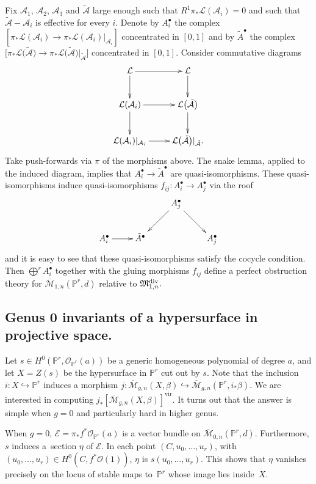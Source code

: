 \documentclass[pdftex]{sigma}
\numberwithin{equation}{section}
\newcommand{\PP}{\mathbb P}
\newcommand{\MM}[4]{\overline{\mathcal M}_{#1,#2}(#3,#4)}
\theoremstyle{plain}
\theoremstyle{definition}
\theoremstyle{remark}
\begin{document}
Fix $\mathcal{A}_1$, $\mathcal{A}_2$, $\mathcal{A}_3$ and $\tilde{\mathcal{A}}$ large enough such that $R^1\pi_*\mathcal{L}(\mathcal{A}_i)=0$ and such that $\tilde{\mathcal{A}}-\mathcal{A}_i$ is effective for every $i$. Denote by $A_i^{\bullet}$ the complex $[\pi_*\mathcal{L}(\mathcal{A}_i)\to \pi_*\mathcal{L}(\mathcal{A}_i)|_{\mathcal{A}_i}]$ concentrated in $[0,1]$ and by $\tilde{A}^{\bullet}$ the complex $\big[\pi_*\mathcal{L}\big(\tilde{\mathcal{A}}\big)\to \pi_*\mathcal{L}\big(\tilde{\mathcal{A}}\big)|_{\tilde{\mathcal{A}}}\big]$ concentrated in $[0,1]$. Consider commutative diagrams
\[\xymatrix{\mathcal{L}\ar[r]\ar[d]&\mathcal{L}\ar[d]\\
\mathcal{L}(\mathcal{A}_i)\ar[r]\ar[d]&\mathcal{L}\big(\tilde{\mathcal{A}}\big)\ar[d]\\
\mathcal{L}(\mathcal{A}_i)|_{\mathcal{A}_i}\ar[r]&\mathcal{L}\big(\tilde{\mathcal{A}}\big)|_{\tilde{\mathcal{A}}}.
}
\]
Take push-forwards via $\pi$ of the morphisms above. The snake lemma, applied to the induced diagram, implies that $A_i^{\bullet}\to \tilde{A}^{\bullet}$ are quasi-isomorphisms. These quasi-isomorphisms induce quasi-isomorphisms $f_{ij}\colon A_i^{\bullet}\to A_j^{\bullet}$ via the roof
\[ \xymatrix{
&&A_j^{\bullet}\ar[ld]\ar[rd]\\
A_i^{\bullet}\ar[r]&\tilde{A}^{\bullet}&&A_j^{\bullet}
}
\]
and it is easy to see that these quasi-isomorphisms satisfy the cocycle condition. Then $\bigoplus^r A_i^{\bullet}$ together with the gluing morphisms $f_{ij}$ define a perfect obstruction theory for $\MM{1}{n}{\mathbb P^r}{d}$ relative to $\mathfrak{M}^{\rm div}_{1,n}.$


\subsection{Genus 0 invariants of a hypersurface in projective space.}

Let $s\in H^0(\mathbb P^r,\mathcal O_{\mathbb P^r}(a))$ be a generic homogeneous polynomial of degree $a$, and let $X=Z(s)$ be the hypersurface in $\PP^r$ cut out by $s$. Note that the inclusion $i\colon X\hookrightarrow\mathbb P^r$ induces a morphism $j\colon \MM{g}{n}{X}{\beta}\hookrightarrow \MM{g}{n}{\mathbb P^r}{i_*\beta}$. We are interested in computing $j_*[\MM{g}{n}{X}{\beta}]^\text{vir}$. It turns out that the answer is simple when $g=0$ and particularly hard in higher genus.

When $g=0$, $\mathcal{E}=\pi_*f^*\mathcal O_{\mathbb P^r}(a)$ is a vector bundle on $\MM{0}{n}{\mathbb P^r}{d}$. Furthermore, $s$ induces a~section $\eta$ of $\mathcal{E}$. In each point $(C,u_0,\ldots,u_r)$, with $(u_0,\ldots,u_r)\in H^0( C,f^*\mathcal O(1))$, $\eta$ is $s(u_0,\ldots,u_r)$. This shows that $\eta$ vanishes precisely on the locus of stable maps to~$\mathbb P^r$ whose image lies inside~$X$.
\end{document}
